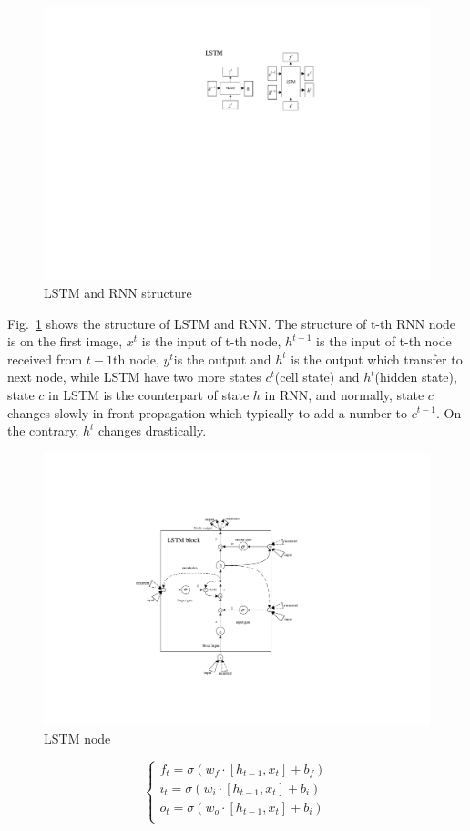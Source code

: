 \documentclass[conference, a4paper]{IEEEtran}
\begin{document}
      \begin{figure}[htbp]
        \centerline{\includegraphics[width=0.7\linewidth]{figures/LSTM_struc.pdf}}
        \caption{LSTM and RNN structure}
        \label{fig:LSTM}
      \end{figure}

      Fig.~\ref{fig:LSTM} shows the structure of LSTM and RNN. The structure of t-th RNN node is on the first image, $x^t$ is the input of t-th node, $h^{t-1}$ is the input of t-th node received from $t-1$th node, $y^t$is the output and $h^t$ is the output which transfer to next node, while LSTM have two more states $c^t$(cell state) and $h^t$(hidden state), state $c$ in LSTM is the counterpart of state $h$ in RNN, and normally, state $c$ changes slowly in front propagation which typically to add a number to $c^{t-1}$. On the contrary, $h^t$ changes drastically.

      \begin{figure}[htbp]
        \centerline{\includegraphics[width=0.7\linewidth]{figures/LSTM_node.pdf}}
        \caption{LSTM node}
        \label{fig:LSTM2}
      \end{figure}

      \begin{equation}
        \begin{cases}	f_t=\sigma \left( w_f\cdot \left[ h_{t-1},x_t \right] +b_f \right)\\	i_t=\sigma \left( w_i\cdot \left[ h_{t-1},x_t \right] +b_i \right)\\	o_t=\sigma \left( w_o\cdot \left[ h_{t-1},x_t \right] +b_i \right)\\\end{cases}
        \label{eq:gate}
      \end{equation}
\end{document}
